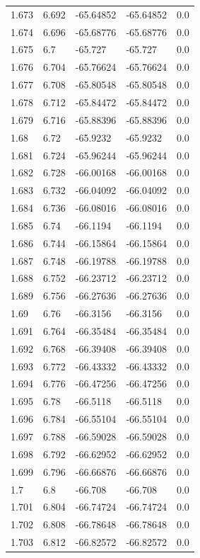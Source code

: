 \begin{tabular}{lllll}
1.673 & 6.692 & -65.64852 & -65.64852 & 0.0 \\
1.674 & 6.696 & -65.68776 & -65.68776 & 0.0 \\
1.675 & 6.7 & -65.727 & -65.727 & 0.0 \\
1.676 & 6.704 & -65.76624 & -65.76624 & 0.0 \\
1.677 & 6.708 & -65.80548 & -65.80548 & 0.0 \\
1.678 & 6.712 & -65.84472 & -65.84472 & 0.0 \\
1.679 & 6.716 & -65.88396 & -65.88396 & 0.0 \\
1.68 & 6.72 & -65.9232 & -65.9232 & 0.0 \\
1.681 & 6.724 & -65.96244 & -65.96244 & 0.0 \\
1.682 & 6.728 & -66.00168 & -66.00168 & 0.0 \\
1.683 & 6.732 & -66.04092 & -66.04092 & 0.0 \\
1.684 & 6.736 & -66.08016 & -66.08016 & 0.0 \\
1.685 & 6.74 & -66.1194 & -66.1194 & 0.0 \\
1.686 & 6.744 & -66.15864 & -66.15864 & 0.0 \\
1.687 & 6.748 & -66.19788 & -66.19788 & 0.0 \\
1.688 & 6.752 & -66.23712 & -66.23712 & 0.0 \\
1.689 & 6.756 & -66.27636 & -66.27636 & 0.0 \\
1.69 & 6.76 & -66.3156 & -66.3156 & 0.0 \\
1.691 & 6.764 & -66.35484 & -66.35484 & 0.0 \\
1.692 & 6.768 & -66.39408 & -66.39408 & 0.0 \\
1.693 & 6.772 & -66.43332 & -66.43332 & 0.0 \\
1.694 & 6.776 & -66.47256 & -66.47256 & 0.0 \\
1.695 & 6.78 & -66.5118 & -66.5118 & 0.0 \\
1.696 & 6.784 & -66.55104 & -66.55104 & 0.0 \\
1.697 & 6.788 & -66.59028 & -66.59028 & 0.0 \\
1.698 & 6.792 & -66.62952 & -66.62952 & 0.0 \\
1.699 & 6.796 & -66.66876 & -66.66876 & 0.0 \\
1.7 & 6.8 & -66.708 & -66.708 & 0.0 \\
1.701 & 6.804 & -66.74724 & -66.74724 & 0.0 \\
1.702 & 6.808 & -66.78648 & -66.78648 & 0.0 \\
1.703 & 6.812 & -66.82572 & -66.82572 & 0.0 \\

\end{tabular}
